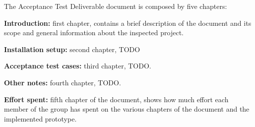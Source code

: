 The Acceptance Test Deliverable document is composed by five chapters:

\textbf{Introduction:} first chapter, contains a brief description of the document and its scope and general information about the inspected project.

\textbf{Installation setup:} second chapter, TODO

\textbf{Acceptance test cases:} third chapter, TODO.

\textbf{Other notes:} fourth chapter, TODO.

\textbf{Effort spent:} fifth chapter of the document, shows how much effort each member of the group has spent on the various chapters of the document and the implemented prototype.